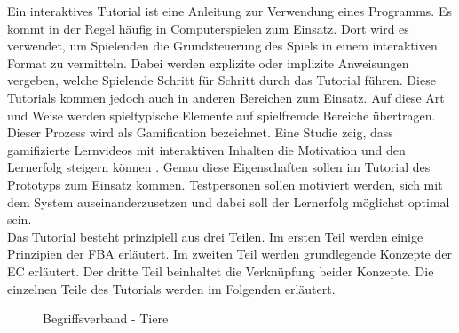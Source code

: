 Ein interaktives Tutorial ist eine Anleitung zur Verwendung eines Programms.
Es kommt in der Regel häufig in Computerspielen zum Einsatz.
Dort wird es verwendet, um Spielenden die Grundsteuerung des Spiels in einem interaktiven Format zu vermitteln.
Dabei werden explizite oder implizite Anweisungen vergeben, welche Spielende Schritt für Schritt durch das Tutorial führen.
Diese Tutorials kommen jedoch auch in anderen Bereichen zum Einsatz.
Auf diese Art und Weise werden spieltypische Elemente auf spielfremde Bereiche übertragen.
Dieser Prozess wird als Gamification bezeichnet.
Eine Studie zeig, dass gamifizierte Lernvideos mit interaktiven Inhalten die Motivation und den Lernerfolg steigern können \cite{gamification-videos}.
Genau diese Eigenschaften sollen im Tutorial des Prototyps zum Einsatz kommen.
Testpersonen sollen motiviert werden, sich mit dem System auseinanderzusetzen und dabei soll der Lernerfolg möglichst optimal sein.\\

Das Tutorial besteht prinzipiell aus drei Teilen.
Im ersten Teil werden einige Prinzipien der \ac{FBA} erläutert.
Im zweiten Teil werden grundlegende Konzepte der \ac{EC} erläutert.
Der dritte Teil beinhaltet die Verknüpfung beider Konzepte.
Die einzelnen Teile des Tutorials werden im Folgenden erläutert.\\

\begin{figure}[!ht]
    \centering
    \caption{\label{fig:begriffsverband-tiere}Begriffsverband - Tiere}
\end{figure}

